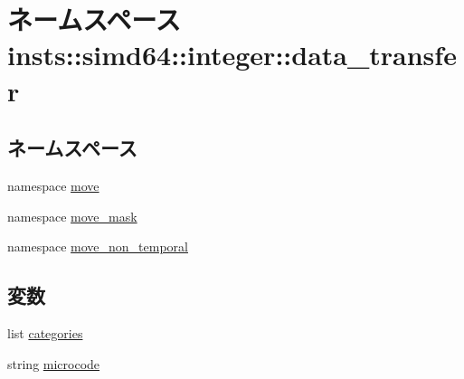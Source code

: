\hypertarget{namespaceinsts_1_1simd64_1_1integer_1_1data__transfer}{
\section{ネームスペース insts::simd64::integer::data\_\-transfer}
\label{namespaceinsts_1_1simd64_1_1integer_1_1data__transfer}
}
\subsection*{ネームスペース}
\begin{DoxyCompactItemize}
\item 
namespace \hyperlink{namespaceinsts_1_1simd64_1_1integer_1_1data__transfer_1_1move}{move}
\item 
namespace \hyperlink{namespaceinsts_1_1simd64_1_1integer_1_1data__transfer_1_1move__mask}{move\_\-mask}
\item 
namespace \hyperlink{namespaceinsts_1_1simd64_1_1integer_1_1data__transfer_1_1move__non__temporal}{move\_\-non\_\-temporal}
\end{DoxyCompactItemize}
\subsection*{変数}
\begin{DoxyCompactItemize}
\item 
list \hyperlink{namespaceinsts_1_1simd64_1_1integer_1_1data__transfer_a273cf0f1630af14c1582f05e53354a55}{categories}
\item 
string \hyperlink{namespaceinsts_1_1simd64_1_1integer_1_1data__transfer_a770f11a173e99389a8802f0107ed8f52}{microcode}
\end{DoxyCompactItemize}


